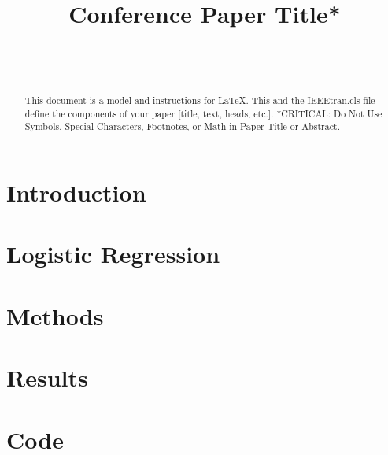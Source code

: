 \documentclass[journal,12pt]{IEEEtran} %
\begin{document}
\title{Conference Paper Title*}

\author{%
    \\%
    \\%
}

\maketitle
\clearpage

\begin{abstract}
    This document is a model and instructions for \LaTeX.
    This and the IEEEtran.cls file define the components of your paper [title, text, heads, etc.]. *CRITICAL: Do Not Use Symbols, Special Characters, Footnotes,
    or Math in Paper Title or Abstract.
\end{abstract}
\clearpage


\section{Introduction}


\section{Logistic Regression}

 
\clearpage

\section{Methods}


\section{Results}



\clearpage

\singlespacing



\clearpage
\onecolumn

\appendix
\renewcommand{\thesection}{\Alph{section}}

\section{Code}\label{sec:code}
\end{document}

